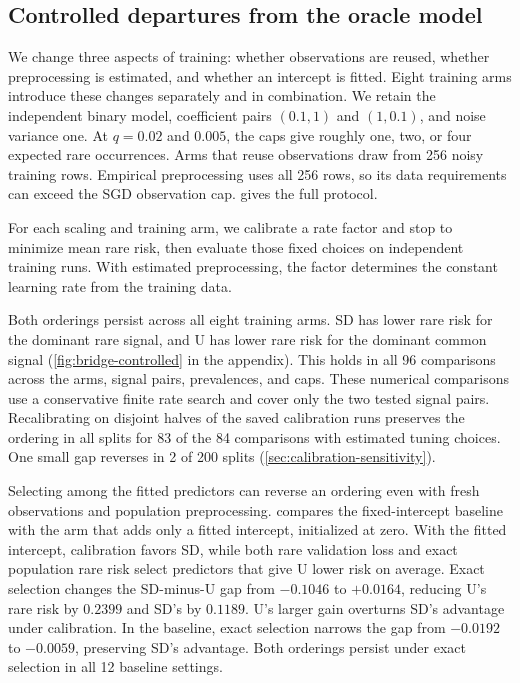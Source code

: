 \documentclass{alt2027}
\begin{document}
\subsection{Controlled departures from the oracle model}
\label{sec:theory-bridge}

We change three aspects of training: whether observations are reused, whether
preprocessing is estimated, and whether an intercept is fitted. Eight training
arms introduce these changes separately and in combination. We retain the
independent binary model, coefficient pairs $(0.1,1)$ and $(1,0.1)$, and noise
variance one. At $q = 0.02$ and $0.005$, the caps give roughly one, two, or four
expected rare occurrences. Arms that reuse observations draw from 256 noisy
training rows. Empirical preprocessing uses all 256 rows, so its data
requirements can exceed the SGD observation cap.
 gives the full protocol.

For each scaling and training arm, we calibrate a rate factor and stop to
minimize mean rare risk, then evaluate those fixed choices on independent
training runs. With estimated preprocessing, the factor determines the constant
learning rate from the training data.

Both orderings persist across all eight training arms. SD has lower rare risk
for the dominant rare signal, and U has lower rare risk for the dominant common
signal (\cref{fig:bridge-controlled} in the appendix). This holds in all 96
comparisons across the arms, signal pairs, prevalences, and caps. These
numerical comparisons use a conservative finite rate search and cover only the
two tested signal pairs. Recalibrating on disjoint halves of the saved
calibration runs preserves the ordering in all splits for 83 of the 84
comparisons with estimated tuning choices. One small gap reverses in 2 of 200
splits (\cref{sec:calibration-sensitivity}).

Selecting among the fitted predictors can reverse an ordering even with fresh
observations and population preprocessing.  compares
the fixed-intercept baseline with the arm that adds only a fitted intercept,
initialized at zero. With the fitted intercept, calibration favors SD, while
both rare validation loss and exact population rare risk select predictors that
give U lower risk on average. Exact selection changes the SD-minus-U gap from
$-0.1046$ to $+0.0164$, reducing U's rare risk by $0.2399$ and SD's by $0.1189$.
U's larger gain overturns SD's advantage under calibration. In the baseline,
exact selection narrows the gap from $-0.0192$ to $-0.0059$, preserving SD's
advantage. Both orderings persist under exact selection in all 12 baseline
settings.
\end{document}
